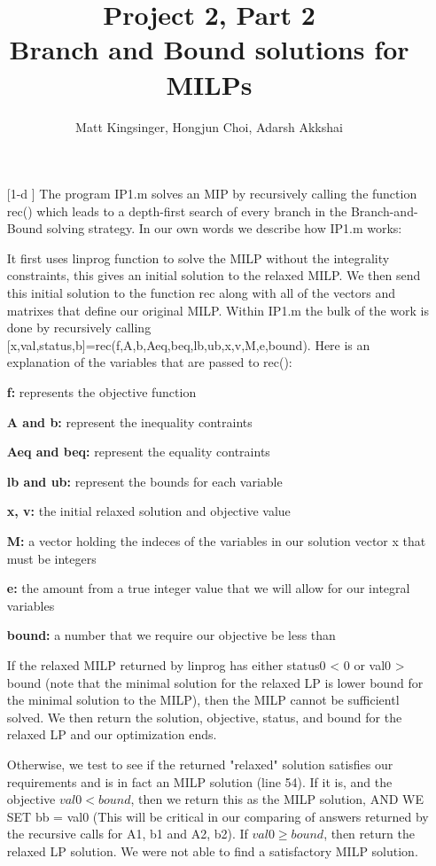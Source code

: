 \documentclass{article}
\title{Project 2, Part 2\\ Branch and Bound solutions for MILPs}
\author{Matt Kingsinger, Hongjun Choi, Adarsh Akkshai}
\begin{document}
\maketitle

\begin{itemize}
\item[[1-d]] The program IP1.m solves an MIP by recursively calling the function rec() which leads to a depth-first search of every branch in the Branch-and-Bound solving 
strategy. In our own words we describe how IP1.m works:
\vspace{.2in}

It first uses linprog function to solve the MILP without the integrality constraints, this gives an initial solution to the relaxed MILP. We then send this
initial solution to the function rec along with all of the vectors and matrixes that define our original MILP. Within IP1.m the bulk of the work is done by recursively calling [x,val,status,b]=rec(f,A,b,Aeq,beq,lb,ub,x,v,M,e,bound). Here is an explanation of the variables that are passed to rec():

\textbf{f:} represents the objective function

\textbf{A and b:} represent the inequality contraints

\textbf{Aeq and beq:} represent the equality contraints

\textbf{lb and ub:} represent the bounds for each variable

\textbf{x, v:} the initial relaxed solution and objective value

\textbf{M:} a vector holding the indeces of the variables in our solution vector x that must be integers

\textbf{e:} the amount from a true integer value that we will allow for our integral variables

\textbf{bound:} a number that we require our objective be less than
\vspace{.2in}

If the relaxed MILP returned by linprog has either status0 < 0 or
        val0 > bound (note that the minimal solution for the relaxed LP
        is lower bound for the minimal solution to the MILP), then the
        MILP cannot be sufficientl solved. We then return the solution,
        objective, status, and bound for the relaxed LP and our optimization
        ends.
\vspace{.1in}

Otherwise, we test to see if the returned "relaxed" solution satisfies
        our requirements and is in fact an MILP solution (line 54). If it is,
        and the objective $val0 < bound$, then we return this as the MILP
        solution, AND WE SET bb = val0 (This will be critical in our comparing of answers
        returned by the recursive calls for A1, b1 and A2, b2). If $val0 \geq bound$, then return the relaxed LP solution. We
        were not able to find a satisfactory MILP solution.
\vspace{.1in}


\end{itemize}
\end{document}
